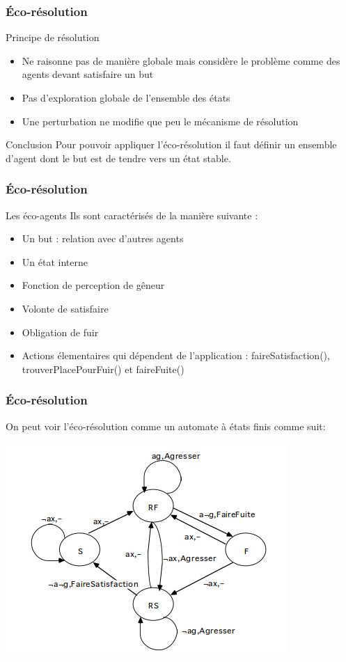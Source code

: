 
\begin{frame}
    \frametitle{Éco-résolution}
    \begin{block}{Principe de résolution}
  		 \begin{itemize}
   			 \item Ne raisonne pas de manière globale mais considère le problème comme des agents devant satisfaire un but
    			 \item Pas d'exploration globale de l'ensemble des états
    			 \item Une perturbation ne modifie que peu le mécanisme de résolution  
         \end{itemize} 
	\end{block}
	\pause
	\begin{alertblock}{Conclusion}
		Pour pouvoir appliquer l'éco-résolution il faut définir un ensemble d'agent dont le but est de tendre vers un état stable.
	\end{alertblock}
\end{frame}

\begin{frame}
    \frametitle{Éco-résolution}
    \begin{block}{Les éco-agents}
		 Ils sont caractérisés de la manière suivante :
  		 \begin{itemize}
   			 \item Un but : relation avec d'autres agents 
    			 \item Un état interne
    			 \item Fonction de perception de gêneur
    			 \item Volonte de satisfaire
    			 \item Obligation de fuir 
    			 \item Actions élementaires qui dépendent de l'application :
    			 faireSatisfaction(), trouverPlacePourFuir() et faireFuite()
         \end{itemize} 
	\end{block}
\end{frame}

\begin{frame}
    \frametitle{Éco-résolution}
    On peut voir l'éco-résolution comme un automate à états finis comme suit: 
    \begin{center}
        \includegraphics[scale=0.5]{images/AutomateEcoResolution.png}
    \end{center}
\end{frame}